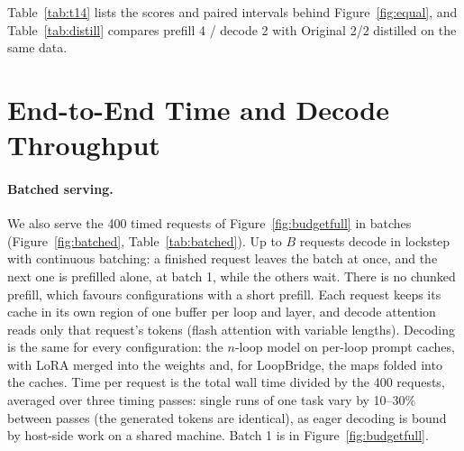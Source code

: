 \documentclass[11pt]{article}
\newcommand{\nat}[1]{Original~#1/#1}
\begin{document}
Table~\ref{tab:t14} lists the scores and paired intervals behind Figure~\ref{fig:equal}, and Table~\ref{tab:distill}
compares prefill 4 / decode 2 with Original 2/2 distilled on the same data.

\section{End-to-End Time and Decode Throughput}
\label{app:serve}

\begin{table}[h]
\centering\small
\setlength\tabcolsep{3pt}
\caption{\textbf{End to end per answer}, prefill included (batch 1, one B300; mean seconds and generated tokens per
answer over $N$ problems; GSM8K: consecutive problem IDs 1--192; budgets 4,096
and 8,192 tokens). On GSM8K, prefill 4 / decode 2 spends $1.38\times$ the decode time per generated token of \nat{2}
(pooled time over pooled tokens), but its answers are shorter.}
\label{tab:e2e}
\end{table}

\paragraph{Batched serving.} We also serve the 400 timed requests of Figure~\ref{fig:budgetfull} in batches
(Figure~\ref{fig:batched}, Table~\ref{tab:batched}). Up to $B$ requests decode in lockstep with continuous batching: a
finished request leaves the batch at once, and the next one is prefilled alone, at batch 1, while the others wait. There
is no chunked prefill, which favours configurations with a short prefill. Each request keeps its cache in its own region of
one buffer per loop and layer, and decode attention reads only that request's tokens (flash attention with variable
lengths). Decoding is the same for every configuration: the $n$-loop model on per-loop prompt caches, with LoRA merged
into the weights and, for LoopBridge, the maps folded into the caches. Time per request is the total wall time divided
by the 400 requests, averaged over three timing passes: single runs of one task vary by 10--30\% between passes (the
generated tokens are identical), as eager decoding is bound by host-side work on a shared machine. Batch 1 is in
Figure~\ref{fig:budgetfull}.
\end{document}
